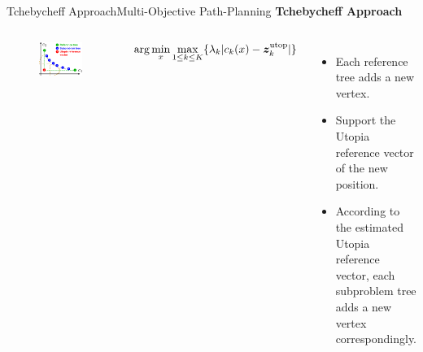 \begin{frame}{Tchebycheff Approach}{Multi-Objective Path-Planning}
	{\bf Tchebycheff Approach}
	\begin{columns}
		\begin{figure}[t]
			\centering
			\includegraphics[width=\linewidth]{figure/MORRF_tchebycheff}
		\end{figure}
		
        \begin{block}{}
		\begin{equation}
		\nonumber
		\arg\min_x\max_{1 \leq k \leq K}  \{ \lambda_{k} | c_{k}(x) - \bm{z}^{\rm utop}_{k}  | \}
		\end{equation}
		\end{block}

		
		\footnotesize{
			\begin{itemize}
				\item Each reference tree adds a new vertex.
				\item Support the Utopia reference vector of the new position.
				\item According to the estimated Utopia reference vector, each subproblem tree adds a new vertex correspondingly.
			\end{itemize}
		}
	\end{columns}
\end{frame}

